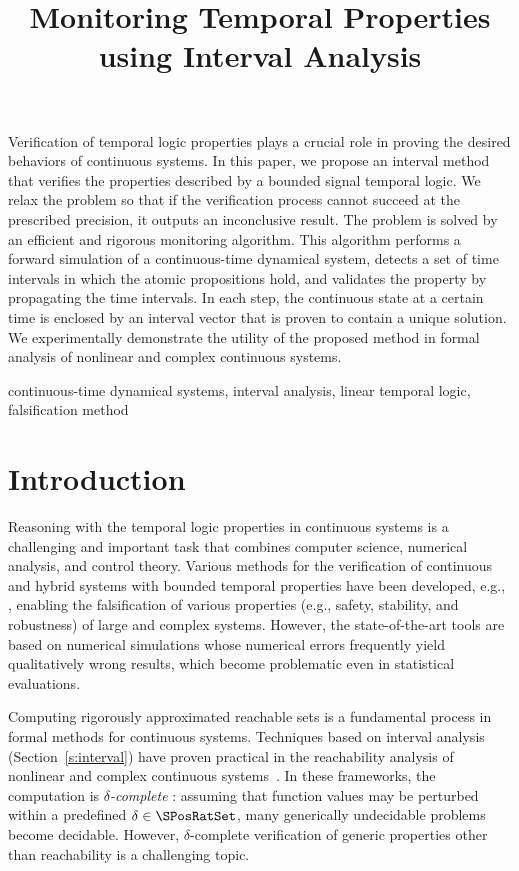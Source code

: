 \documentclass[paper]{ieice}
\title[Monitoring Temporal Properties using Interval Analysis]
      {Monitoring Temporal Properties using Interval Analysis}
\begin{document}
\maketitle

\begin{summary}
Verification of temporal logic properties plays a crucial role in proving the desired behaviors of continuous systems. 
In this paper, we propose an interval method that verifies the properties described by a bounded signal temporal logic.
We relax the problem so that if the verification process cannot succeed at the prescribed precision, it outputs an inconclusive result. The problem is solved by an efficient and rigorous monitoring algorithm.
This algorithm performs a forward simulation of a continuous-time dynamical system, detects a set of time intervals in which the atomic propositions hold, and validates the property by propagating the time intervals.
In each step, the continuous state at a certain time is enclosed by an interval vector that is proven to contain a unique solution.
We experimentally demonstrate the utility of the proposed method in formal analysis of nonlinear and complex continuous systems.
\end{summary}
\begin{keywords}
  continuous-time dynamical systems, interval analysis, linear temporal logic, falsification method
\end{keywords}

\section{Introduction}\label{intro}

Reasoning with the temporal logic properties in continuous systems is a challenging and important task that combines computer science, numerical analysis, and control theory.
Various methods for the verification of continuous and hybrid systems with bounded temporal properties have been developed, e.g., 
\cite{Plaku2009,Nghiem2010,David2012,Zuliani2013}, 
enabling the falsification of various properties (e.g., safety, stability, and robustness) of large and complex systems. However, the state-of-the-art tools are based on numerical simulations whose numerical errors frequently yield qualitatively wrong results, which become problematic even in statistical evaluations.

Computing rigorously approximated reachable sets is a fundamental process in formal methods for continuous systems.
Techniques based on interval analysis (Section~\ref{s:interval}) have proven practical in the reachability analysis of nonlinear and complex continuous systems~\cite{Eggers2008,Collins2008,Ramdani2011,Ishii2011,Chen2012,Gao2013:SMODE}. 
In these frameworks, the computation is \emph{$\delta$-complete} \cite{Gao2012}: assuming that function values may be perturbed within a predefined $\delta \in \SPosRatSet$, 
many generically undecidable problems become decidable.
However, $\delta$-complete verification of generic properties other than reachability is a challenging topic.
\end{document}
